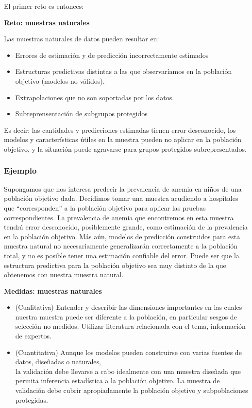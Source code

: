 \documentclass[
]{book}
\providecommand{\tightlist}{%
  \setlength{\itemsep}{0pt}\setlength{\parskip}{0pt}}
\let\BeginKnitrBlock\begin \let\EndKnitrBlock\end
\begin{document}
El primer reto es entonces:

\BeginKnitrBlock{rmdnote}
\textbf{Reto: muestras naturales}

Las muestras naturales de datos pueden resultar en:

\begin{itemize}
\tightlist
\item
  Errores de estimación y de predicción incorrectamente estimados
\item
  Estructuras predictivas distintas a las que observaríamos en la población objetivo (modelos no válidos).
\item
  Extrapolaciones que no son soportadas por los datos.
\item
  Subreprensentación de subgrupos protegidos
\end{itemize}

Es decir: las cantidades y predicciones estimadas tienen error desconocido, los modelos
y características útiles en la muestra pueden no aplicar en la población objetivo, y la situación puede agravarse para grupos protegidos subrepresentados.
\EndKnitrBlock{rmdnote}

\hypertarget{ejemplo}{%
\subsubsection*{Ejemplo}\label{ejemplo}}


Supongamos que nos interesa predecir la prevalencia de anemia en niños de una población objetivo
dada. Decidimos tomar una muestra acudiendo a hospitales que ``corresponden'' a la población
objetivo para aplicar las pruebas correspondientes. La prevalencia de anemia que encontremos en esta
muestra tendrá error desconocido, posiblemente grande, como estimación de la prevalencia
en la población objetivo. Más aún, modelos de predicción construidos para esta muestra natural
no necesariamente generalizarán correctamente a la población total, y no es posible tener
una estimación confiable del error. Puede ser que la estructura predictiva
para la población objetivo sea muy distinto de la que obtenemos con nuestra muestra natural.

\BeginKnitrBlock{rmdtip}
\textbf{Medidas: muestras naturales}

\begin{itemize}
\item
  (Cualitativa) Entender y describir las dimensiones importantes en las cuales nuestra muestra puede ser diferente a la población,
  en particular sesgos de selección no medidos. Utilizar literatura relacionada con el tema, información de expertos.
\item
  (Cuantitativa) Aunque los modelos pueden construirse con varias fuentes
  de datos, diseñadas o naturales,\\
  la validación debe llevarse a cabo idealmente con una muestra diseñada que permita
  inferencia estadística a la población objetivo. La muestra de validación debe cubrir
  apropiadamente la población objetivo y subpoblaciones protegidas.
\end{itemize}
\EndKnitrBlock{rmdtip}
\end{document}
